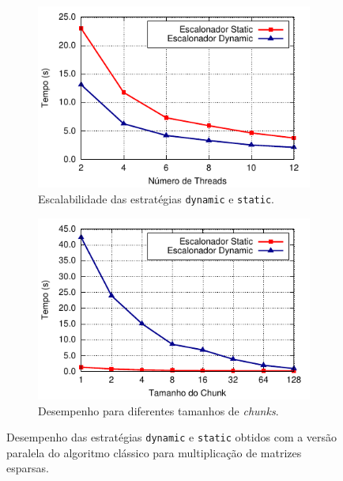 \documentclass{SBCbookchapter}
\begin{document}
		\begin{figure}[t]
			\captionsetup[subfigure]{justification=centering}
			\centering
				\begin{subfigure}{0.45\linewidth}
					\includegraphics[width=\linewidth]{img/smm}
					\caption{Escalabilidade das estratégias \texttt{dynamic} e \texttt{static}.}
					\label{fig:static-dynamic-guided}
				\end{subfigure}
				\quad
				\begin{subfigure}{0.45\linewidth}
					\includegraphics[width=\linewidth]{img/chunk-size}
					\caption{Desempenho para diferentes tamanhos de
					\textit{chunks}.}
					\label{fig:chunk-size}
				\end{subfigure}
			\caption{Desempenho das estratégias \texttt{dynamic} e \texttt{static} obtidos com a versão paralela
			do algoritmo clássico para multiplicação de matrizes esparsas.}
		\end{figure}
\end{document}
